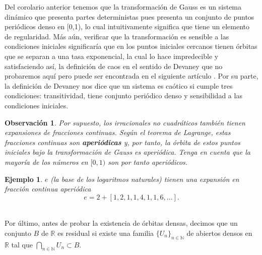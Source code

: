 \documentclass[12pt]{report}
\newtheorem{obs}{{Observación}}[section]
\newtheorem{ejem}{Ejemplo}[section]
\begin{document}
Del corolario anterior tenemos que la transformación de Gauss es un sistema dinámico que presenta partes deterministas pues presenta un conjunto de puntos periódicos denso en [0,1), lo cual intuitivamente significa que tiene un elemento de regularidad. Más aún, verificar que la transformación es sensible a las condiciones iniciales significaría que en los puntos iniciales cercanos tienen órbitas que se separan a una tasa exponencial, la cual lo hace impredecible y satisfaciendo así, la definición de caos en el sentido de Devaney \cite{Devaney1989} que no probaremos aquí pero puede ser encontrada en el siguiente artículo \cite{chaos}. Por su parte, la definición de Devaney nos dice que un sistema es caótico si cumple tres condiciones: transitividad, tiene conjunto periódico denso y sensibilidad a las condiciones iniciales. 

\begin{obs}
Por supuesto, los irracionales no cuadráticos también tienen expansiones de fracciones continuas. Según el teorema de Lagrange, estas fracciones continuas son \textbf{aperiódicas} y, por tanto, la órbita de estos puntos iniciales bajo la transformación de Gauss es aperiódica. Tenga en cuenta que la mayoría de los números en $[0,1)$ son por tanto aperiódicos.
\end{obs}

\begin{ejem}
$e$ (la base de los logaritmos naturales) tienen una expansión en fracción continua aperiódica 
$$
e=2+[1,2,1,1,4,1,1,6,\ldots]. 
$$
\end{ejem}
\\

Por último, antes de probar la existencia de órbitas densas, decimos que un conjunto $B$ de $\mathbb{R}$ es residual si existe una familia $\{U_{n}\}_{n\in\mathbb{N}}$ de abiertos densos en $\mathbb{R}$ tal que $\displaystyle\bigcap_{n\in\mathbb{N}}U_{n}\subset B$. 
\\
\end{document}
